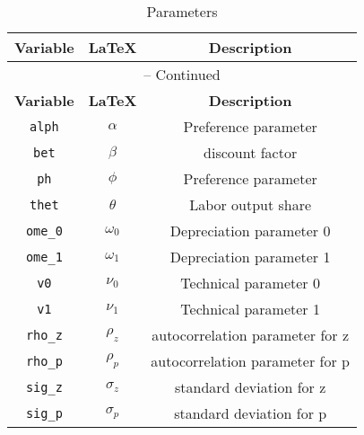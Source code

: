 \begin{center}
\begin{longtable}{ccc}
\caption{Parameters}\\%
\hline%
\multicolumn{1}{c}{\textbf{Variable}} &
\multicolumn{1}{c}{\textbf{\LaTeX}} &
\multicolumn{1}{c}{\textbf{Description}}\\%
\hline\hline%
\endfirsthead
\multicolumn{3}{c}{{\tablename} \thetable{} -- Continued}\\%
\hline%
\multicolumn{1}{c}{\textbf{Variable}} &
\multicolumn{1}{c}{\textbf{\LaTeX}} &
\multicolumn{1}{c}{\textbf{Description}}\\%
\hline\hline%
\endhead
\texttt{alph} & ${\alpha}$ & Preference parameter\\
\texttt{bet} & ${\beta}$ & discount factor\\
\texttt{ph} & ${\phi}$ & Preference parameter\\
\texttt{thet} & ${\theta}$ & Labor output share\\
\texttt{ome\_0} & ${\omega_0}$ & Depreciation parameter 0\\
\texttt{ome\_1} & ${\omega_1}$ & Depreciation parameter 1\\
\texttt{v0} & ${\nu_0}$ & Technical parameter 0\\
\texttt{v1} & ${\nu_1}$ & Technical parameter 1\\
\texttt{rho\_z} & ${\rho_z}$ & autocorrelation parameter for z\\
\texttt{rho\_p} & ${\rho_p}$ & autocorrelation parameter for p\\
\texttt{sig\_z} & ${\sigma_z}$ & standard deviation for z\\
\texttt{sig\_p} & ${\sigma_p}$ & standard deviation for p\\
\hline%
\end{longtable}
\end{center}
